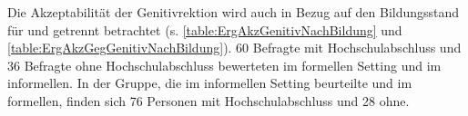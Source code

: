 Die Akzeptabilität der Genitivrektion wird auch in Bezug auf den Bildungsstand für \dank{} und \gegenueber{} getrennt betrachtet (s. \autoref{table:ErgAkzGenitivNachBildung} und \autoref{table:ErgAkzGegGenitivNachBildung}). 
60 Befragte mit Hochschulabschluss und 36 Befragte ohne Hochschulabschluss bewerteten \dank{} im formellen Setting und \gegenueber{} im informellen. 
In der Gruppe, die \dank{} im informellen Setting beurteilte und \gegenueber{} im formellen, finden sich 76 Personen mit Hochschulabschluss und 28 ohne. 
